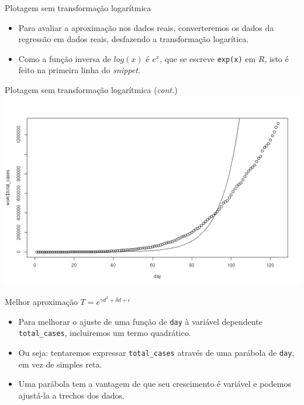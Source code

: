 \documentclass[a4paper,10pt]{beamer}
\begin{document}
\begin{frame}{ Plotagem sem transformação logarítmica }
  
  
  \begin{itemize}
      \item Para avaliar a aproximação nos dados reais, converteremos os 
	  dados da regressão em dados reais, desfazendo a transformação
	  logarítica.
      \item Como a função inversa de $log(x)$ é $e^x$, que se escreve
	  {\tt exp(x)} em $R$, isto é feito na primeira linha do 
	  {\em snippet}.
  \end{itemize}

\end{frame}

\begin{frame}{ Plotagem sem transformação logarítmica ({\em cont.}) }
  \includegraphics[scale=0.375]{plot-unexp.png}

\end{frame}

\begin{frame}{ Melhor aproximação $T = e^{\gamma d^2 + \delta d + \epsilon}$}
  \begin{itemize}
      \item Para melhorar o ajuste de uma função de {\tt day} à variável
	  dependente {\tt total\_cases}, incluiremos um termo quadrático.
      \item Ou seja: tentaremos expressar {\tt total\_cases} através de 
	  uma parábola de {\tt day}, em vez de simples reta.
      \item Uma parábola tem a vantagem de que seu crescimento é variável e 
	  podemos ajustá-la a trechos dos dados.
  \end{itemize}

\end{frame}
\end{document}
